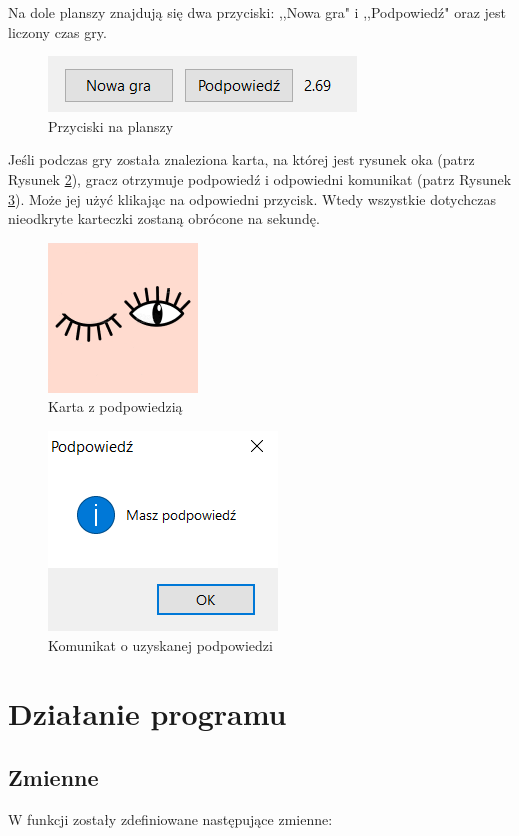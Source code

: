 \documentclass[a4paper]{article}
\begin{document}
Na dole planszy znajdują się dwa przyciski: ,,Nowa gra" i ,,Podpowiedź" oraz jest liczony czas gry.
\begin{figure}[H]
    \centering
    \includegraphics{przyciski.PNG}
    \caption{Przyciski na planszy}
    \label{fig:przyciski}
\end{figure}
Jeśli podczas gry została znaleziona karta, na której jest rysunek oka (patrz Rysunek \ref{fig:oko}), gracz otrzymuje podpowiedź i odpowiedni komunikat (patrz Rysunek \ref{fig:komunikat}). Może jej użyć klikając na odpowiedni przycisk. Wtedy wszystkie dotychczas nieodkryte karteczki zostaną obrócone na sekundę.
\begin{figure}[H]
    \centering
    \includegraphics{oko.png}
    \caption{Karta z podpowiedzią}
    \label{fig:oko}
\end{figure}
\begin{figure}[H]
    \centering
    \includegraphics{podp.PNG}
    \caption{Komunikat o uzyskanej podpowiedzi}
    \label{fig:komunikat}
\end{figure}
\section{Działanie programu}
\subsection{Zmienne}
W funkcji zostały zdefiniowane następujące zmienne: 
\end{document}
